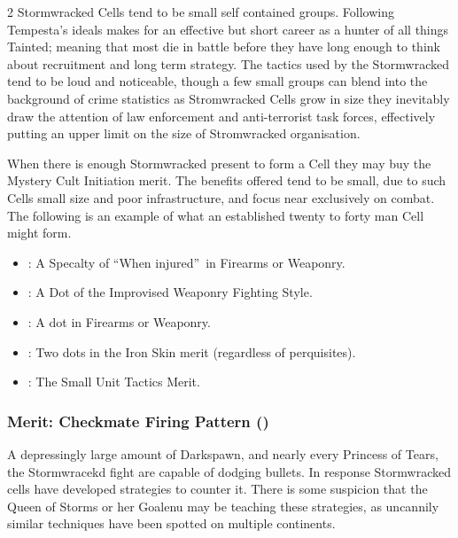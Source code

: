 \begin{multicols}{2}
Stormwracked Cells tend to be small self contained groups. Following Tempesta's ideals makes for an effective but short career as a hunter of all things Tainted; meaning that most die in battle before they have long enough to think about recruitment and long term strategy. The tactics used by the Stormwracked tend to be loud and noticeable, though a few small groups can blend into the background of crime statistics as Stromwracked Cells grow in size they inevitably draw the attention of law enforcement and anti-terrorist task forces, effectively putting an upper limit on the size of Stromwracked organisation. 

When there is enough Stormwracked present to form a Cell they may buy the Mystery Cult Initiation merit. The benefits offered tend to be small, due to such Cells small size and poor infrastructure, and focus near exclusively on combat. The following is an example of what an established twenty to forty man Cell might form.  

\begin{itemize}[label={}]
 \item \textbullet: A Specalty of \textquotedblleft When injured\textquotedblright\, in Firearms or Weaponry.
 \item \textbullet\textbullet: A Dot of the Improvised Weaponry Fighting Style. 
 \item \textbullet\textbullet\textbullet: A dot in Firearms or Weaponry.
 \item \textbullet\textbullet\textbullet\textbullet: Two dots in the Iron Skin merit (regardless of perquisites).
 \item \textbullet\textbullet\textbullet\textbullet\textbullet: The Small Unit Tactics Merit.
\end{itemize}

\begin{mybox}

\subsubsection*{Merit: Checkmate Firing Pattern (\textbullet\textbullet)}

A depressingly large amount of Darkspawn, and nearly every Princess of Tears, the Stormwracekd fight are capable of dodging bullets. In response Stormwracked cells have developed strategies to counter it. There is some suspicion that the Queen of Storms or her Goalenu may be teaching these strategies, as uncannily similar techniques have been spotted on multiple continents.


\end{mybox}
\end{multicols}
